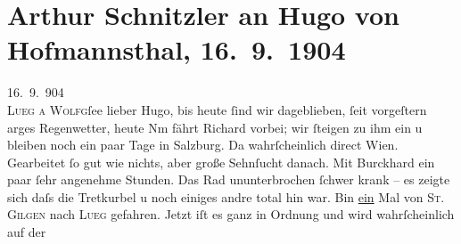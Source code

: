 

         
         \renewcommand{\erwaehntePersonen}{Personen: Richard Beer-Hofmann, Paula Beer-Hofmann, Max Eugen Burckhard, Hugo von Hofmannsthal, Olga Schnitzler}
         \renewcommand{\erwaehnteOrte}{Orte: Lueg am Wolfgangsee, Salzburg, St. Gilgen, Wien}
         \renewcommand{\erwaehnteWerke}{}
               \section[Arthur Schnitzler an Hugo von Hofmannsthal, 16. 9. 1904]{ Arthur Schnitzler an Hugo von Hofmannsthal, 16. 9. 1904}\nopagebreak{}\rehead{ }\begin{ledgroupsized}[t]{13cm}\normalsize\beginnumbering{} \toendnotes[C]{\smallbreak\pagebreak[2]} 
\toendnotes[C]{\smallbreak}\pstart
           \raggedleft{}{\pb}16. 9. 904{\\}\textsc{Lueg a Wolfg}ſee\pend
           \pstart
           lieber Hugo, bis heute ſind wir dageblieben, ſeit vorgeſtern arges
               Regenwetter, heute Nm fährt Richard vorbei; wir ſteigen zu ihm ein u bleiben noch ein paar Tage in Salzburg. Da{\geminationn}
               wahrſcheinlich direct Wien. Gearbeitet ſo gut wie
               nichts, aber große {\pb}Sehnſucht danach. Mit Burckhard ein paar ſehr angenehme Stunden. Das
               Rad ununterbrochen ſchwer krank – es zeigte sich daſs die Tretkurbel u noch einiges
               andre total hin war. Bin \uline{ein} Mal von \textsc{St. Gilgen} nach \textsc{Lueg} gefahren. Jetzt iſt es ganz in Ordnung und wird wahrſcheinlich auf der

\end{ledgroupsized}
